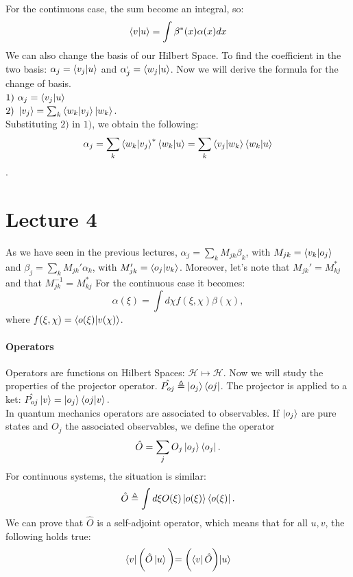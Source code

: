 \documentclass{article}
\begin{document}
  For the continuous case, the sum become an integral, so:
  $$ \bra{v}\ket{u} = \int \beta^*(x) \alpha(x) dx$$
We can also change the basis of our Hilbert Space. To find the coefficient in the two basis:
$ \alpha_j = \bra{v_j} \ket{u}$ and $\alpha^,_j = \bra{w_j}\ket{u}$.
Now we will derive the formula for the change of basis. \\ 
$1) \ \alpha_j = \bra{v_j}\ket{u}$ \\
$2)\  \ket{v_j} = \sum_k \bra{w_k} \ket{v_j} \ket{w_k}$. \\
Substituting $2)$ in $ 1)$, we obtain the following: $$\alpha_j = \sum_k \bra{w_k} \ket{v_j}^* \bra{w_k} \ket{u} = \sum_k \bra{v_j} \ket{w_k} \bra{w_k} \ket{u}$$.

\section{Lecture 4}

As we have seen in the previous lectures, $ \alpha_j = \sum_k M_{jk} \beta_k$, with $ M_{jk}=\bra{v_k}\ket{o_j}$ and $ \beta_j = \sum_k M_{jk}' \alpha_k$, with $ M_{jk}' = \bra{o_j}\ket{v_k}$. Moreover, let's note that $M_{jk}' = M_{kj}^*$ and that $M_{jk}^{-1}=M_{kj}^*$
For the continuous case it becomes:
$$ \alpha(\xi) = \int d\chi f(\xi,\chi) \beta(\chi),$$where  $f(\xi,\chi) = \bra{o(\xi)}\ket{v(\chi)}$.

\paragraph{Operators} 

Operators are functions on Hilbert Spaces: $\mathcal{H} \mapsto \mathcal{H}$.
Now we will study the properties of the projector operator.
$\hat{P_{oj}} \triangleq \ket{o_j}\bra{oj}$.
The projector is applied to a ket: $\hat{P_{oj}}\ket{v} =\ket{o_j}\bra{oj}\ket{v}.$ \\
In quantum mechanics operators are associated to observables. If $\ket{o_j}$ are pure states and $O_j$ the associated observables, we define the operator $$\hat{O} = \sum_j O_j \ket{o_j}\bra{o_j}.$$
For continuous systems, the situation is similar:
$$\hat{O} \triangleq \int d\xi O(\xi) \ket{o(\xi)}\bra{o(\xi)}.$$
We can prove that $\hat{O}$ is a self-adjoint operator, which means that for all $u,v$, the following holds true:
$$ \bra{v} \biggl( \hat{O} \ket{u} \biggl) = \biggl( \bra{v} \hat{O} \biggl) \ket{u}$$
\end{document}
